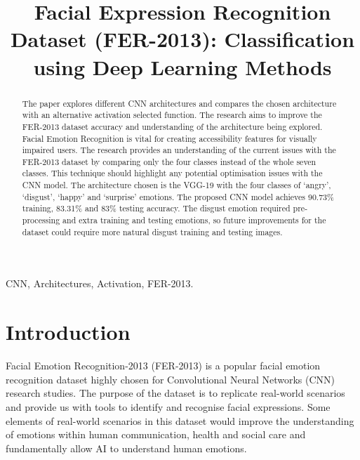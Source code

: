 \documentclass[conference]{IEEEtran}
\begin{document}
	\title{Facial Expression Recognition Dataset (FER-2013): Classification using Deep Learning Methods}

	\author{
	}

     \maketitle
     \thispagestyle{plain}
    \pagestyle{plain}
    
    \begin{abstract}
      The paper explores different CNN architectures and compares the chosen architecture with an alternative activation selected function. The research aims to improve the FER-2013 dataset accuracy and understanding of the architecture being explored. Facial Emotion Recognition is vital for creating accessibility features for visually impaired users. The research provides an understanding of the current issues with the FER-2013 dataset by comparing only the four classes instead of the whole seven classes. This technique should highlight any potential optimisation issues with the CNN model. The architecture chosen is the VGG-19 with the four classes of `angry', `disgust', `happy' and `surprise' emotions. The proposed CNN model achieves 90.73\% training, 83.31\% and 83\% testing accuracy. The disgust emotion required pre-processing and extra training and testing emotions, so future improvements for the dataset could require more natural disgust training and testing images.
    \end{abstract}

    \begin{IEEEkeywords}
      CNN, Architectures, Activation, FER-2013.
    \end{IEEEkeywords}

    \section{Introduction}
      Facial Emotion Recognition-2013 (FER-2013) is a popular facial emotion recognition dataset highly chosen for Convolutional Neural Networks (CNN) research studies. The purpose of the dataset is to replicate real-world scenarios and provide us with tools to identify and recognise facial expressions. Some elements of real-world scenarios in this dataset would improve the understanding of emotions within human communication, health and social care and fundamentally allow AI to understand human emotions.
          
\end{document}
